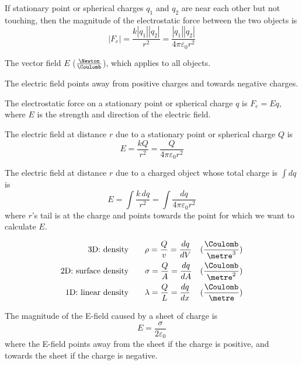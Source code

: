 \begin{namedlaw}
  If stationary point or spherical charges $q_1$ and $q_2$ are near each other but not touching, then the magnitude of the electrostatic force between the two objects is
  \[
    |F_e| = \frac{k |q_1| |q_2|}{r^2} = \frac{|q_1| |q_2|}{4 \pi \varepsilon_0 r^2}
  \]
\end{namedlaw}

\begin{definition}
  The vector field $E$ ($\frac{\Newton}{\Coulomb}$), which applies to all objects.

  The electric field points away from positive charges and towards negative charges.
\end{definition}

\begin{law}
  The electrostatic force on a stationary point or spherical charge $q$ is $F_e = Eq$, where $E$ is the strength and direction of the electric field.
\end{law}

\begin{law}
  The electric field at distance $r$ due to a stationary point or spherical charge $Q$ is
  \[
    E = \frac{kQ}{r^2} = \frac{Q}{4\pi\varepsilon_0 r^2}
  \]

  The electric field at distance $r$ due to a charged object whose total charge is $\int dq$ is
  \[
    E = \int \frac{k \,dq}{r^2} = \int \frac{dq}{4 \pi \varepsilon_0 r^2}
  \]
  where $r$'s tail is at the charge and points towards the point for which we want to calculate $E$.
\end{law}

\begin{definition}
  \begin{align*}
    \text{3D: density} \qquad & \rho = \frac{Q}{v} = \frac{dq}{dV} & (\frac{\Coulomb}{\metre^3}) \\
    \text{2D: surface density} \qquad & \sigma = \frac{Q}{A} = \frac{dq}{dA} & (\frac{\Coulomb}{\metre^2}) \\
    \text{1D: linear density} \qquad & \lambda = \frac{Q}{L} = \frac{dq}{dx} & (\frac{\Coulomb}{\metre}) \\
  \end{align*}
\end{definition}

\begin{example}
  The magnitude of the E-field caused by a sheet of charge is
  \[
    E = \frac{\sigma}{2\varepsilon_0}
  \]
  where the E-field points away from the sheet if the charge is positive, and towards the sheet if the charge is negative.
\end{example}

